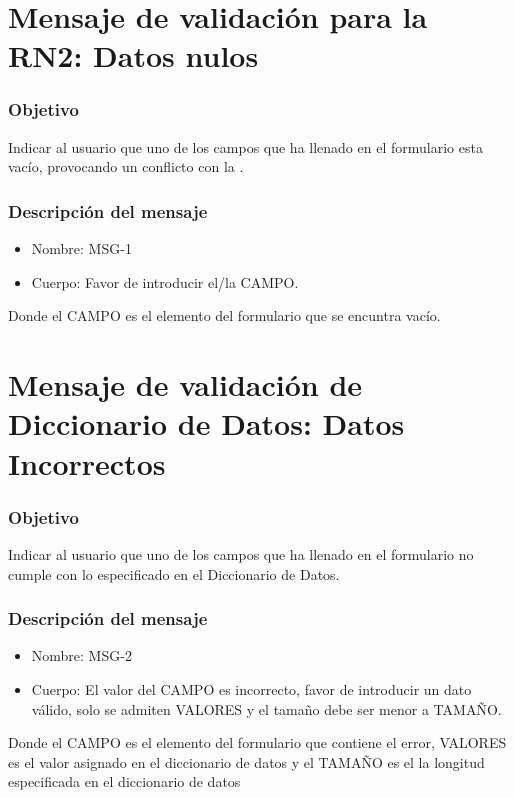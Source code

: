 \section{Mensaje de validación para la RN2: Datos nulos} \label{MSG1}

\subsubsection{Objetivo}
Indicar al usuario que uno de los campos que ha llenado en el formulario esta vacío, provocando un conflicto con la .

\subsubsection{Descripción del mensaje}
\begin{itemize}
\item Nombre: MSG-1
\item Cuerpo: Favor de introducir el/la CAMPO.

\end{itemize}
Donde el CAMPO es el elemento del formulario que se encuntra vacío.


\section{Mensaje de validación de Diccionario de Datos: Datos Incorrectos}\label{MSG2}

\subsubsection{Objetivo}
Indicar al usuario que uno de los campos que ha llenado en el formulario no cumple con lo especificado en el Diccionario de Datos.

\subsubsection{Descripción del mensaje}
\begin{itemize}
\item Nombre: MSG-2
\item Cuerpo: El  valor del CAMPO es incorrecto, favor de introducir un dato válido, solo se admiten VALORES y el tamaño debe ser menor a TAMAÑO.

\end{itemize}
Donde el CAMPO es el elemento del formulario que contiene el error, VALORES es el valor asignado en el diccionario de datos y el TAMAÑO es el la longitud especificada en el diccionario de datos


